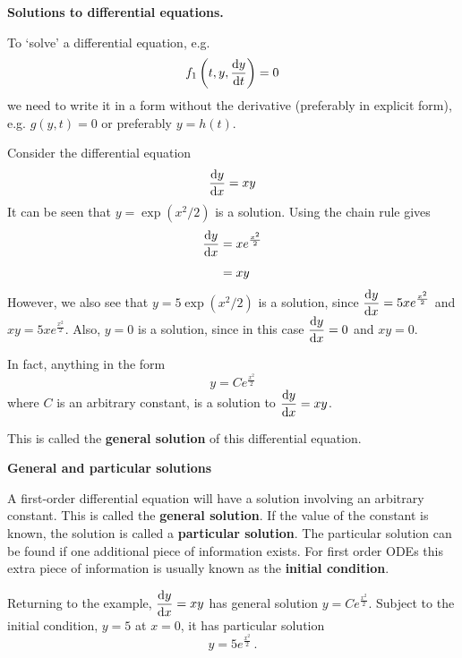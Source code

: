 
\textbf{Solutions to differential equations.}

To `solve' a differential equation, e.g.
\[
{f}_{1}\left(t,y,\frac{{\rm d} y}{{\rm d} t}\right)=0
\]
we need to write it in a form without the derivative (preferably in explicit form), e.g. $g\left(y,t\right)=0$ or preferably $y=h(t)$.


Consider the differential equation
\[
\frac{{\rm d} y}{{\rm d} x}=xy
\]
It can be seen that $y=\exp ({x}^{2}/2)$ is a solution. Using the chain rule gives
\begin{align*}
\frac{{\rm d} y}{{\rm d} x}&=x{e}^{\frac{{x}^{2}}{2}}
\\[4pt]
&=xy
\end{align*}
However, we also see that $\displaystyle y=5\exp ({x}^{2}/2)$ is a solution, since $\displaystyle \frac{{\rm d} y}{{\rm d} x}=5x{e}^{\frac{{x}^{2}}{2}}$ and $\displaystyle xy=5x{e}^{\frac{{x}^{2}}{2}}$.
Also, $y=0$ is a solution, since in this case $\displaystyle \frac{{\rm d} y}{{\rm d} x}=0$ and $xy=0$.


In fact, anything in the form
\[
y=C{e}^{\frac{{x}^{2}}{2}}
\]
where $C$ is an arbitrary constant, is a solution to $\displaystyle \frac{{\rm d} y}{{\rm d} x}=xy$.

This is called the \textbf{general solution} of this differential equation.


\textbf{General and particular solutions}

A first-order differential equation will have a solution involving an arbitrary constant. This is called the \textbf{general solution}. If the value of the constant is known, the solution is called a \textbf{particular solution}. The particular solution can be found if one additional piece of information exists. For first order ODEs this extra piece of information is usually known as the \textbf{initial condition}.


Returning to the example, $\displaystyle \frac{{\rm d} y}{{\rm d} x}=xy$ has general solution $\displaystyle y=C{e}^{\frac{{x}^{2}}{2}}$. Subject to the initial condition, $y=5$ at $x=0$, it has particular solution
\[
y=5{e}^{\frac{{x}^{2}}{2}} \, .
\]



